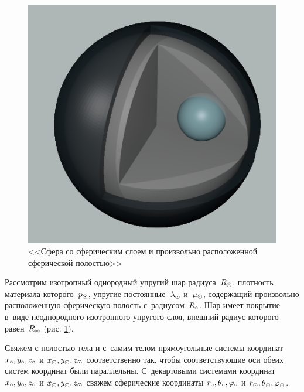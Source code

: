 
\begin{figure}[h]
\begin{center}
\begin{minipage}[h]{0.47\linewidth}
\includegraphics[width=1\linewidth]{sphere_edited.png}
\caption{<<Сфера со сферическим слоем и произвольно расположенной сферической полостью>>}\label{pic_1}
\end{minipage}
\end{center}
\end{figure}

Рассмотрим изотропный однородный упругий шар радиуса~$R_\odot$, плотность материала которого~$p_\odot$, упругие постоянные~$\lambda_\odot$ и~$\mu_\odot$, содержащий произвольно расположенную сферическую полость с~радиусом~$R_\circ$. Шар имеет покрытие в~виде неоднородного изотропного упругого слоя, внешний радиус которого равен~$R_\circledcirc$ (рис. \cref{pic_1}).
 
Свяжем с полостью тела и с~самим телом прямоугольные системы координат $x_\circ, y_\circ, z_\circ$ и $x_\odot, y_\odot, z_\odot$ соответственно так, чтобы соответствующие оси обеих систем координат были параллельны. С~декартовыми системами координат $x_\circ, y_\circ, z_\circ$ и $x_\odot, y_\odot, z_\odot$ свяжем сферические координаты $r_\circ, \theta_\circ, \varphi_\circ$ и $r_\odot, \theta_\odot, \varphi_\odot$.

